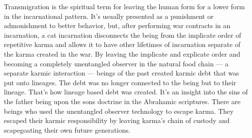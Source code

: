 \documentclass[letterpaper,11pt,twoside,titlepage,onecolumn,openany]{book}
\begin{document}
Transmigration is the spiritual term for leaving the human form for a
lower form in the incarnational pattern. It's usually presented as a
punishment or admonishment to better behavior, but, after performing war
contracts in an incarnation, a cat incarnation disconnects the being
from the implicate order of repetitive karma and allows it to have other
lifetimes of incarnation separate of the karma created in the war. By
leaving the implicate and explicate order and becoming a completely
unentangled observer in the natural food chain --- a separate karmic
interaction --- beings of the past created karmic debt that was put onto
lineages. The debt was no longer connected to the being but to their
lineage. That's how lineage based debt was created. It's an insight into
the sins of the father being upon the sons doctrine in the Abrahamic
scriptures. There are beings who used the unentangled observer
technology to escape karma. They escaped their karmic responsibility by
leaving karma's chain of custody and scapegoating their own future
generations.
\end{document}
